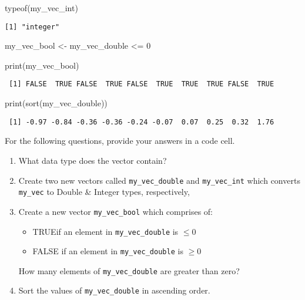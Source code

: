 \documentclass[
  letterpaper,
  DIV=11,
  numbers=noendperiod]{scrartcl}
\newenvironment{Shaded}{\begin{snugshade}}{\end{snugshade}}
\newcommand{\DecValTok}[1]{\textcolor[rgb]{0.68,0.00,0.00}{#1}}
\newcommand{\FunctionTok}[1]{\textcolor[rgb]{0.28,0.35,0.67}{#1}}
\newcommand{\NormalTok}[1]{\textcolor[rgb]{0.00,0.23,0.31}{#1}}
\newcommand{\OtherTok}[1]{\textcolor[rgb]{0.00,0.23,0.31}{#1}}
\newcommand{\SpecialCharTok}[1]{\textcolor[rgb]{0.37,0.37,0.37}{#1}}
\providecommand{\tightlist}{%
  \setlength{\itemsep}{0pt}\setlength{\parskip}{0pt}}\usepackage{longtable,booktabs,array}
\begin{document}
\begin{Shaded}
\begin{Highlighting}[]
\FunctionTok{typeof}\NormalTok{(my\_vec\_int)}
\end{Highlighting}
\end{Shaded}

\begin{verbatim}
[1] "integer"
\end{verbatim}

\begin{Shaded}
\begin{Highlighting}[]
\NormalTok{my\_vec\_bool }\OtherTok{\textless{}{-}}\NormalTok{ my\_vec\_double }\SpecialCharTok{\textless{}=} \DecValTok{0}

\FunctionTok{print}\NormalTok{(my\_vec\_bool)}
\end{Highlighting}
\end{Shaded}

\begin{verbatim}
 [1] FALSE  TRUE FALSE  TRUE FALSE  TRUE  TRUE  TRUE FALSE  TRUE
\end{verbatim}

\begin{Shaded}
\begin{Highlighting}[]
\FunctionTok{print}\NormalTok{(}\FunctionTok{sort}\NormalTok{(my\_vec\_double))}
\end{Highlighting}
\end{Shaded}

\begin{verbatim}
 [1] -0.97 -0.84 -0.36 -0.36 -0.24 -0.07  0.07  0.25  0.32  1.76
\end{verbatim}

For the following questions, provide your answers in a code cell.

\begin{enumerate}
\def\labelenumi{\arabic{enumi}.}
\item
  What data type does the vector contain?
\item
  Create two new vectors called \texttt{my\_vec\_double} and
  \texttt{my\_vec\_int} which converts \texttt{my\_vec} to Double \&
  Integer types, respectively,
\item
  Create a new vector \texttt{my\_vec\_bool} which comprises of:

  \begin{itemize}
  \tightlist
  \item
    TRUEif an element in \texttt{my\_vec\_double} is \(\le 0\)
  \item
    FALSE if an element in \texttt{my\_vec\_double} is \(\ge 0\)
  \end{itemize}

  How many elements of \texttt{my\_vec\_double} are greater than zero?
\item
  Sort the values of \texttt{my\_vec\_double} in ascending order.
\end{enumerate}
\end{document}
